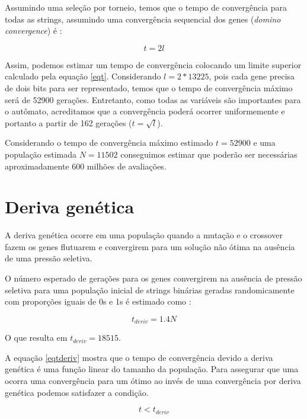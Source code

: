 \documentclass[]{scrreprt}
\begin{document}
Assumindo uma seleção por torneio, temos que o tempo de convergência para todas as strings, assumindo uma convergência sequencial dos genes (\emph{domino convergence}) é \cite{Thierens:1994:CMG:645822.670524,Thierens98dominoconvergence}:

\begin{equation}\label{eqt}
t = 2l
\end{equation}

Assim, podemos estimar um tempo de convergência colocando um limite superior calculado pela equação \ref{eqt}. Considerando $l=2*13225$, pois cada gene precisa de dois bits para ser representado, temos que o tempo de convergência máximo será de 52900 gerações. Entretanto, como todas as variáveis são importantes para o autômato, acreditamos que a convergência poderá ocorrer uniformemente e portanto a partir de 162 gerações ($t=\sqrt{l}$).

Considerando o tempo de convergência máximo estimado $t=52900$ e uma população estimada $N=11502$ conseguimos estimar que poderão ser necessárias aproximadamente 600 milhões de avaliações.

\section{Deriva genética}

A deriva genética ocorre em uma população quando a mutação e o crossover fazem os genes flutuarem e convergirem para um solução não ótima na ausência de uma pressão seletiva.

O número esperado de gerações para os genes convergirem na ausência de pressão seletiva para uma população inicial de strings binárias geradas randomicamente com proporções iguais de 0s e 1s é estimado como \cite{Thierens98dominoconvergence}:

\begin{equation}\label{eqtderiv}
t_{deriv} = 1.4N
\end{equation}

O que resulta em $t_{deriv}=18515$.

A equação \ref{eqtderiv} mostra que o tempo de convergência devido a deriva genética é uma função linear do tamanho da população. Para assegurar que uma ocorra uma convergência para um ótimo ao invés de uma convergência por deriva genética podemos satisfazer a condição.

\begin{equation}\label{eqttd}
t < t_{deriv} 
\end{equation}
\end{document}
